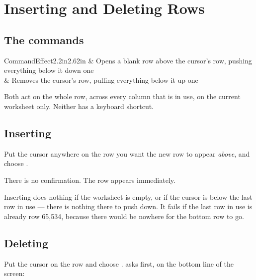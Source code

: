 \chapter{Inserting and Deleting Rows}
\label{ch:rows}

\section{The commands}

\begin{cctable}{Command}{Effect}{2.2in}{2.62in}
 & Opens a blank row above the cursor's row,
pushing everything below it down one \\
 & Removes the cursor's row, pulling everything
below it up one \\
\end{cctable}

Both act on the whole row, across every column that is in use, on the current
worksheet only. Neither has a keyboard shortcut.

\section{Inserting}

Put the cursor anywhere on the row you want the new row to appear \emph{above},
and choose .

There is no confirmation. The row appears immediately.

Inserting does nothing if the worksheet is empty, or if the cursor is below the
last row in use --- there is nothing there to push down. It fails if the last
row in use is already row 65,534, because there would be nowhere for the bottom
row to go.

\section{Deleting}

Put the cursor on the row and choose . \ccprod{}
asks first, on the bottom line of the screen:

\begin{ccfigure}
\caption{The delete-row question, on the message line}
\label{fig:delrow}
\end{ccfigure}

